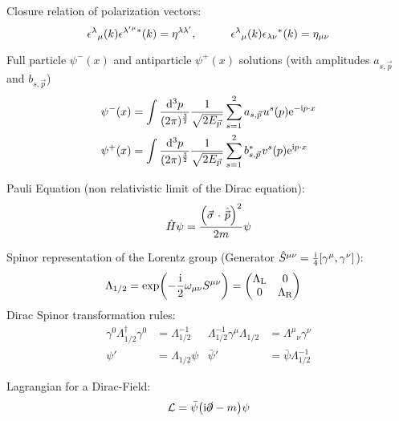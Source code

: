 			\noindent
			Closure relation of polarization vectors:
			\begin{equation}
				\epsilon^{\lambda}{}_{\mu}(k)\epsilon^{\lambda^{\prime}{}^{\mu}\ast}(k)=\eta^{\lambda\lambda^{\prime}},
				\hspace{30pt}
				\epsilon^{\lambda}{}_{\mu}(k)\epsilon_{\lambda\nu}{}^{\ast}(k)=\eta_{\mu\nu}
			\end{equation}

			\noindent
			Full particle $\psi^{-}(x)$ and antiparticle $\psi^{+}(x)$ solutions (with amplitudes $a_{s,\vec{p}}$ and $b_{s,\vec{p}}$)
			\begin{equation}
				\begin{aligned}
					\psi^{-}(x) &= \int\frac{\dd^{3}p}{(2\pi)^{\frac{3}{2}}}\frac{1}{\sqrt{2E_{\vec{p}}}}\sum_{s=1}^{2}a_{s, \vec{p}}u^{s}(p)\ex^{-\i p\cdot x} \\
					\psi^{+}(x) &= \int\frac{\dd^{3}p}{(2\pi)^{\frac{3}{2}}}\frac{1}{\sqrt{2E_{\vec{p}}}}\sum_{s=1}^{2}{b_{s, \vec{p}}^{*}}v^{s}(p)\ex^{\i p\cdot x}
				\end{aligned}
			\end{equation}

			\noindent
			Pauli Equation (non relativistic limit of the Dirac equation):
			\begin{equation}
				\hat{H}\psi = \frac{\qty(\vec{\sigma}\cdot\hat{\vec{p}})^2}{2m} \psi
			\end{equation}

			\noindent
			Spinor representation of the Lorentz group (Generator $\hat{S}^{\mu\nu} = \frac{\mathrm{i}}{4}[\gamma^\mu,\gamma^\nu]$):
			\begin{align}
				\Lambda_{1/2} &= \exp(-\frac{\i}{2}\omega_{\mu\nu}S^{\mu\nu}) = \mqty(\Lambda_\text{L} & 0 \\ 0 & \Lambda_\text{R})
			\end{align}
			Dirac Spinor transformation rules:
			\begin{align}
				\gamma^0 \Lambda_{1/2}^\dagger \gamma^0	&= \Lambda_{1/2}^{-1}
				&
				\Lambda_{1/2}^{-1} \gamma^\mu \Lambda_{1/2} &= \Lambda^\mu{}_\nu \gamma^\nu \\
				\psi' &= \Lambda_{1/2} \psi
				&
				\bar{\psi}' &= \bar{\psi} \Lambda_{1/2}^{-1}
			\end{align}

			\noindent
			Lagrangian for a Dirac-Field:
			\begin{equation}
				\mathcal{L} = \bar{\psi} \qty(\mathrm{i} \slashed{\partial} - m) \psi
			\end{equation}

